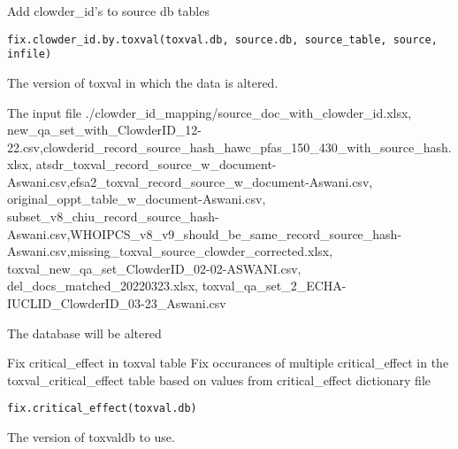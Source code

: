 \documentclass[letterpaper]{book}
\begin{document}
%
\begin{Description}\relax
Add clowder\_id's to source db tables
\end{Description}
%
\begin{Usage}
\begin{verbatim}
fix.clowder_id.by.toxval(toxval.db, source.db, source_table, source, infile)
\end{verbatim}
\end{Usage}
%
\begin{Arguments}
\begin{ldescription}
\item[\code{toxval.db}] The version of toxval in which the data is altered.

\item[\code{infile}] The input file ./clowder\_id\_mapping/source\_doc\_with\_clowder\_id.xlsx, new\_qa\_set\_with\_ClowderID\_12-22.csv,clowderid\_record\_source\_hash\_hawc\_pfas\_150\_430\_with\_source\_hash.xlsx,
atsdr\_toxval\_record\_source\_w\_document-Aswani.csv,efsa2\_toxval\_record\_source\_w\_document-Aswani.csv, original\_oppt\_table\_w\_document-Aswani.csv,
subset\_v8\_chiu\_record\_source\_hash-Aswani.csv,WHOIPCS\_v8\_v9\_should\_be\_same\_record\_source\_hash-Aswani.csv,missing\_toxval\_source\_clowder\_corrected.xlsx, toxval\_new\_qa\_set\_ClowderID\_02-02-ASWANI.csv,
del\_docs\_matched\_20220323.xlsx, toxval\_qa\_set\_2\_ECHA-IUCLID\_ClowderID\_03-23\_Aswani.csv
\end{ldescription}
\end{Arguments}
%
\begin{Value}
The database will be altered
\end{Value}
%
\begin{Description}\relax
Fix critical\_effect in toxval table
Fix occurances of multiple critical\_effect in the toxval\_critical\_effect table based on values from critical\_effect dictionary file
\end{Description}
%
\begin{Usage}
\begin{verbatim}
fix.critical_effect(toxval.db)
\end{verbatim}
\end{Usage}
%
\begin{Arguments}
\begin{ldescription}
\item[\code{toxval.db}] The version of toxvaldb to use.
\end{ldescription}
\end{Arguments}
\end{document}
